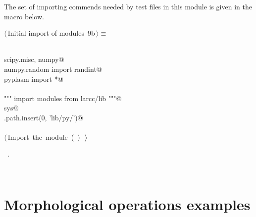 \documentclass[11pt,oneside]{article}	%
\begin{document}
The set of importing commends needed by test files in this module is given in the macro below.

\begin{flushleft} \small
\begin{minipage}{\linewidth} \label{scrap16}
\protect{}$\langle\,$Initial import of modules\nobreak\ {\footnotesize 9b}$\,\rangle\equiv$
\vspace{-1ex}
\begin{list}{}{} \item
\mbox{}\verb@@\\
\mbox{}\verb@import scipy.misc, numpy@\\
\mbox{}\verb@from numpy.random import randint@\\
\mbox{}\verb@from pyplasm import *@\\
\mbox{}\verb@@\\
\mbox{}\verb@""" import modules from larcc/lib """@\\
\mbox{}\verb@import sys@\\
\mbox{}\verb@sys.path.insert(0, 'lib/py/')@\\
\mbox{}\verb@@\\
\mbox{}\verb@@\hbox{$\langle\,$Import the module\nobreak\ ({\footnotesize {}\label{scrap17}
 }\mbox{}\verb@largrid@ ) {\footnotesize {}}$\,\rangle$}\verb@@\\
\mbox{}\verb@@{\NWsep}
\end{list}
\vspace{-1ex}
\footnotesize\addtolength{\baselineskip}{-1ex}
\begin{list}{}{\setlength{\itemsep}{-\parsep}\setlength{\itemindent}{-\leftmargin}}
\item \NWtxtMacroRefIn\ .
\end{list}
\end{minipage}\\[4ex]
\end{flushleft}


\section{Morphological operations examples}
\end{document}
